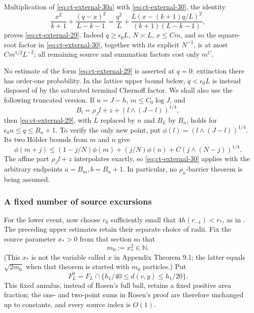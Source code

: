 Multiplication of \eqref{eq:ct-external-30a} with \eqref{eq:ct-external-30}, the identity
\begin{equation}
\frac{x^2}{k+1}+\frac{(q-x)^2}{L-k-1}
 =\frac{q^2}{L}+
   \frac{L(x-(k+1)q/L)^2}{(k+1)(L-k-1)},\label{eq:ct-external-31}
\end{equation}
proves \eqref{eq:ct-external-29}.  Indeed $q\ge\epsilon_0L$, $N\asymp L$,
$x\le Cm$, and so the square-root factor in \eqref{eq:ct-external-30}, together with its
explicit $N^{-1}$, is at most $Cm^{1/2}L^{-2}$; all remaining source
and summation factors cost only $m^C$.

No estimate of the form \eqref{eq:ct-external-29} is asserted at $q=0$: extinction there
has order-one probability.  In the lattice upper bound below,
$q<\epsilon_0L$ is instead disposed of by the saturated terminal
Chernoff factor.  We shall also use the following truncated version.
If $n=J-h$, $m\le C_0\log J$, and
\[
B_l=\rho_Jl+z+(l\wedge(J-l))^{1/4},
\]
then \eqref{eq:ct-external-29}, with $L$ replaced by $n$ and $B_L$ by $B_n$, holds
for $\epsilon_0n\le q\le B_n+1$.  To verify the only new point, put
$\phi(l)=(l\wedge(J-l))^{1/4}$.  Its two Hölder bounds from $m$
and $n$ give
\begin{equation}
\phi(m+j)\le(1-j/N)\phi(m)+(j/N)\phi(n)
                 +C(j\wedge(N-j))^{1/4}.\label{eq:ct-external-31a}
\end{equation}
The affine part $\rho_Jl+z$ interpolates exactly, so \eqref{eq:ct-external-30} applies with
the arbitrary endpoints $a=B_m,b=B_n+1$.  In particular, no
$\rho_n$-barrier theorem is being assumed.

\subsubsection{A fixed number of source excursions}

For the lower event, now choose $r_0$ sufficiently small that
$4h(r_{-1})<r_*$, as in \cite[Section~3]{Rosen2022}.  The preceding
upper estimates retain their separate choice of radii.  Fix the source
parameter $x_*>0$ from that section so that
\begin{equation}
m_0:=x_*^2\in\mathbb N.\label{eq:ct-external-32a}
\end{equation}
(This $x_*$ is not the variable called $x$ in Appendix Theorem 9.1;
the latter equals $\sqrt{2m_0}$ when that theorem is started with
$m_0$ particles.)  Put
\[
F_L^0=F_L\cap\{h_1/40\le d(v,y)\le h_1/20\}.
\]
This fixed annulus, instead of Rosen's full ball, retains a fixed
positive area fraction; the one- and two-point sums in Rosen's proof are
therefore unchanged up to constants, and every source index is $O(1)$.


